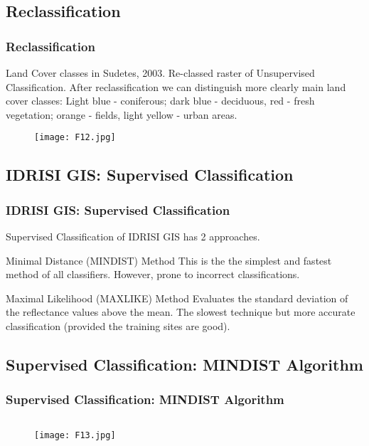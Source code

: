 \documentclass[pdflatex,compress,8pt,
	xcolor={dvipsnames,dvipsnames,svgnames,x11names,table},
	hyperref={
	breaklinks = true, 
	pdfauthor={Lemenkova Polina}, 
	pdfsubject={Preentation}, 
	pdfcreator={Lemenkova Polina}, 
	pdfproducer={Lemenkova Polina}, 
	citecolor=NavyBlue, 
	urlbordercolor=cyan,
	urlcolor = NavyBlue, 
	breaklinks = true}]{beamer}
\begin{document}
\subsection{Reclassification}
\begin{frame}\frametitle{Reclassification}
Land Cover classes in Sudetes, 2003.
Re-classed raster of Unsupervised Classification. After reclassification we can distinguish more clearly main land cover classes: Light blue - coniferous; dark blue - deciduous, red - fresh vegetation; orange - fields, light yellow - urban areas.
\begin{figure}[H]
	\centering
		\texttt{[image: F12.jpg]}
\end{figure}
\end{frame}


\subsection{IDRISI GIS: Supervised Classification}
\begin{frame}\frametitle{IDRISI GIS: Supervised Classification}
Supervised Classification of IDRISI GIS has 2 approaches. 

\begin{block}{Minimal Distance (MINDIST) Method}
This is the the simplest and fastest method of all classifiers. However, prone to incorrect classifications.
\end{block}

\begin{block}{Maximal Likelihood (MAXLIKE) Method}
Evaluates the standard deviation of the reflectance values above the mean. The slowest technique but more accurate classification (provided the training sites are good).
\end{block}

\end{frame}

\subsection{Supervised Classification: MINDIST Algorithm}
\begin{frame}\frametitle{Supervised Classification: MINDIST Algorithm}
\begin{minipage}[0.5\textheight]{\textwidth}
\begin{columns}[T]
\begin{column}{0.5\textwidth}
\begin{figure}[H]
	\centering
		\texttt{[image: F13.jpg]}
\end{figure}
\end{column}
\begin{column}{0.5\textwidth}
\begin{figure}[H]
	\centering
		\vspace{1mm}
\end{figure}
\end{column}
\end{columns}
\end{minipage}
\end{frame}
\end{document}
